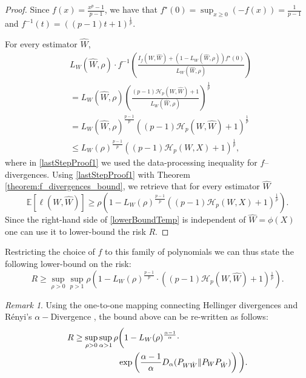 \documentclass[conference]{IEEEtran}
\theoremstyle{plain}
\theoremstyle{definition}
\theoremstyle{remark}
\newtheorem{remark}{Remark}
\begin{document}
\begin{proof}
Since $f(x) = \frac{x^p-1}{p-1}$, we have that $f^\star(0) = \sup_{x \geq 0} (- f(x)) = \frac{1}{p-1}$ and $f^{-1}(t) = ((p-1)t + 1)^\frac1p$.

For every estimator $\hat{W}$,
\begin{align}
    &L_W(\hat{W},\rho)\cdot f^{-1}\left(\frac{I_f(W, \hat{W})+(1-L_W(\hat{W},\rho))f^\star(0)}{L_W(\hat{W},\rho)}\right)  %
    \\&= L_W(\hat{W}, \rho)\left(\frac{(p-1)\mathcal{H}_p(W, \hat{W})+1}{L_W(\hat{W}, \rho)}\right)^{\frac1p} \\&= L_W(\hat{W}, \rho)^{\frac{p-1}{p}}\left((p-1)\mathcal{H}_p(W, \hat{W})+1\right)^{\frac1p} \\&\leq L_W(\rho)^{\frac{p-1}{p}}\left((p-1)\mathcal{H}_p(W, X)+1\right)^{\frac1p}, \label{lastStepProof1}
\end{align}
where in \eqref{lastStepProof1} we used the data-processing inequality for $f$--divergences. Using \eqref{lastStepProof1} with Theorem \ref{theorem:f_divergences_bound}, we retrieve that for every estimator $\hat{W}$
\begin{equation}
    \mathbb{E}[\ell(W, \hat{W})] \geq\rho\!\left(1-L_W(\rho)^{\frac{p-1}{p}}\left((p-1)\mathcal{H}_p(W, X)+1\right)^{\frac1p}\right). \label{lowerBoundTemp}
\end{equation}
Since the right-hand side of \eqref{lowerBoundTemp} is independent of $\hat{W}=\phi(X)$ one can use it to lower-bound the risk $R$. 
\end{proof}
Restricting the choice of $f$ to this family of polynomials we can thus state the following lower-bound on the risk:
\begin{equation}\label{equation:lowerBoundHellinger}
    R \geq \sup_{\rho > 0} \sup_{p > 1}\rho\!\left(\!1- L_W(\rho)^{\frac{p-1}{p}}\!\!\cdot  \left((p-1) \mathcal{H}_p(W,\hat{W}) + 1\right)\! ^\frac{1}{p}\! \right).
\end{equation}
\begin{remark}
Using the one-to-one mapping connecting Hellinger divergences and R\'enyi's $\alpha-$Divergence \cite[Eq. (30)]{sason_f_divergences}, the bound above can be re-written as follows:
\begin{align}
     R \geq \sup_{\rho >0} \sup_{\alpha>1} \rho&\bigg(1- L_W(\rho)^{\frac{\alpha-1}{\alpha}}\cdot 
     \notag \\  &\exp\left(\frac{\alpha-1}{\alpha} D_\alpha(P_{W\hat{W}}\|P_WP_{\hat{W}})\right) \bigg).
\end{align}
\end{remark}
\end{document}
